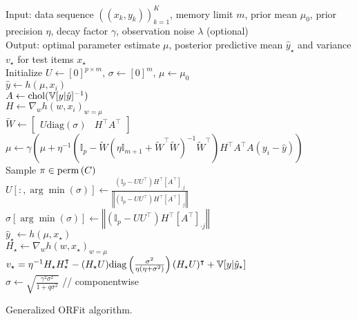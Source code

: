 \begin{algorithm}
\dontprintsemicolon
Input: data sequence $\left(\left(x_{k},y_{k}\right)\right)_{k=1}^{K}$,
memory limit $m$, prior mean $\mu_{0}$, prior precision $\eta$,
decay factor $\gamma$, observation noise $\lambda$ (optional) \\
Output: optimal parameter estimate $\mu$, posterior predictive mean $\hat{y}_\star$ and variance $v_\star$ for test items $x_\star$ \\
Initialize $U\leftarrow\left[0\right]^{p\times m}$, $\sigma\leftarrow\left[0\right]^{m}$,
$\mu\leftarrow\mu_{0}$ \\
 {
$\hat{y}\leftarrow h\left(\mu,x_{i}\right)$ \\
$A\leftarrow\mathrm{chol}(\mathbb{V}[y\vert\hat{y}]^{-1})$  \\
$H\leftarrow\nabla_{w}h\left(w,x_{i}\right)_{w=\mu}$ \\
$\tilde{W}\leftarrow\left[\begin{array}{cc}U\text{diag}(\sigma) & H^{\top}A^{\top}\end{array}\right]$ \\
$\mu\leftarrow\gamma\left(\mu+\eta^{-1}\left(\mathbb{I}_{p}-\tilde{W}\left(\eta\mathbb{I}_{m+1}+\tilde{W}^{\top}\tilde{W}\right)^{-1}\tilde{W}^{\top}\right)H^{\top}A^{\top}A\left(y_{i}-\hat{y}\right)\right)$ \\
Sample $\pi\in{\rm perm}\left(C\right)$ \\
 { 
 {
$U\left[:,\arg\min\left(\sigma\right)\right]\leftarrow\frac{\left(\mathbb{I}_{p}-UU^{\top}\right)H^{\top}\left[A^{\top}\right]_{\cdot j}}{\left\Vert \left(\mathbb{I}_{p}-UU^{\top}\right)H^{\top}\left[A^{\top}\right]_{\cdot j}\right\Vert }$ \\
$\sigma\left[\arg\min\left(\sigma\right)\right]\leftarrow\left\Vert \left(\mathbb{I}_{p}-UU^{\top}\right)H^{\top}\left[A^{\top}\right]_{\cdot j}\right\Vert $ \\
}
}
 {
$\hat{y}_\star \leftarrow h(\mu,x_\star)$ \\
$H_\star\leftarrow\nabla_{w}h\left(w,x_\star\right)_{w=\mu}$ \\
$v_\star = \eta^{-1}H_\star H_\star^\intercal - (H_\star U) \mathrm{diag}\left(\frac{\sigma^2}{\eta(\eta+\sigma^2)}\right) (H_\star U)^\intercal + \mathbb{V}[y|\hat{y}_\star]$\\
}
$\sigma\leftarrow\sqrt{\frac{\gamma^{2}\sigma^{2}}{1+q\sigma^{2}}}$ // componentwise \\
}
\caption{\label{alg:ORFit-general}Generalized ORFit algorithm.}
\end{algorithm}

